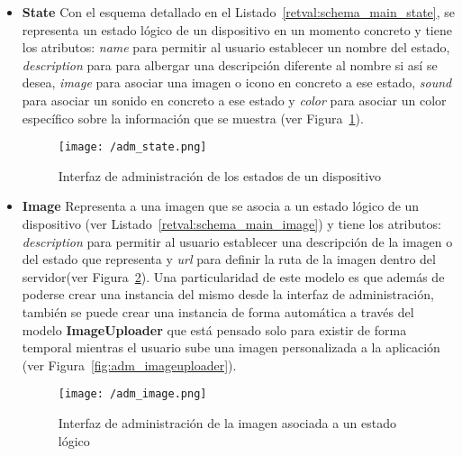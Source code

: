 \begin{itemize}


\item \textbf{State} Con el esquema detallado en el Listado~\ref{retval:schema_main_state}, se representa un estado lógico de un dispositivo en un momento concreto y tiene los atributos: \textit{name} para permitir al usuario establecer un nombre del estado, \textit{description} para para albergar una descripción diferente al nombre si así se desea, \textit{image} para asociar una imagen o icono en concreto a ese estado, \textit{sound} para asociar un sonido en concreto a ese estado y \textit{color} para asociar un color específico sobre la información que se muestra  (ver Figura~\ref{fig:adm_state}).

\begin{figure}[hp]
\centering
\texttt{[image: /adm\_state.png]}
\caption{Interfaz de administración de los estados de un dispositivo}
\label{fig:adm_state}
\end{figure}



\item \textbf{Image} Representa a una imagen que se asocia a un estado lógico de un dispositivo (ver Listado~\ref{retval:schema_main_image}) y tiene los atributos: \textit{description} para permitir al usuario establecer una descripción de la imagen o del estado que representa y \textit{url} para definir la ruta de la imagen dentro del servidor(ver Figura~\ref{fig:adm_image}). Una particularidad de este modelo es que además de poderse crear una instancia del mismo desde la interfaz de administración, también se puede crear una instancia de forma automática a través del modelo \textbf{ImageUploader} que está pensado solo para existir de forma temporal mientras el usuario sube una imagen personalizada a la aplicación (ver Figura~\ref{fig:adm_imageuploader}).

\begin{figure}[h]
\centering
\texttt{[image: /adm\_image.png]}
\caption{Interfaz de administración de la imagen asociada a un estado lógico}
\label{fig:adm_image}
\end{figure}




\end{itemize}
